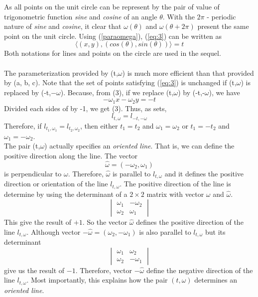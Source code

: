 \documentclass[a4paper]{article}
\begin{document}
As all points on the unit circle can be represent by the pair of value of trigonometric function \textit{sine} and \textit{cosine} of an angle $\theta$. With the $2\pi$ - periodic nature of \textit{sine} and \textit{cosine}, it clear that $\omega(\theta)$ and $\omega(\theta + 2\pi)$ present the same point on the unit circle. Using (\ref{paraomega}), (\ref{eq:3}) can be written as
\begin{equation}\label{ltw}
    \langle (x,y),(cos(\theta),sin(\theta))\rangle = t
\end{equation}
Both notations for lines and points on the circle are used in the sequel.\\ \\
The parameterization provided by (t,$\omega$) is much more efficient than that provided by (a, b, c). Note that the set of points satisfying (\ref{eq:3}) is unchanged if (t,$\omega$) is replaced by (-t,$-\omega$). Because, from (3), if we replace (t,$\omega$) by (-t,-$\omega$), we have
\begin{equation}
    -\omega_1 x - \omega_2 y = -t
\end{equation}
Divided each sides of by -1, we get (3). Thus, as sets,
\begin{equation}
    l_{t,\omega} = l_{-t,-\omega}
\end{equation}
Therefore, if $l_{t_1,\omega_1} = l_{t_2,\omega_2}$, then either $t_1 = t_2$ and $\omega_1 = \omega_2$ or $t_1 = -t_2$ and $\omega_1 = -\omega_2$.\\
The pair (t,$\omega$) actually specifies an \textit{oriented line}. That is, we can define the positive direction along the line. The vector
\begin{equation*}
    \hat{\omega } = (-\omega_2,\omega_1)
\end{equation*}
is perpendicular to $\omega$. Therefore, $\hat{\omega}$ is parallel to $l_{t,\omega}$ and it defines the positive direction or orientation of the line $l_{t,\omega}$. The positive direction of the line is determine by using the determinant of a $2 \times 2$ matrix with vector $\omega$ and $\hat{\omega}$.
\[
\begin{vmatrix}
    \omega_1 & -\omega_2\\
    \omega_2 & \omega_1 
\end{vmatrix}
\]
This give the result of $+1$. So the vector $\hat{\omega}$ defines the positive direction of the line $l_{t,\omega}$.
Although vector $-\hat{\omega} = (\omega_2,-\omega_1)$ is also parallel to $l_{t,\omega}$ but its determinant
\[
    \begin{vmatrix}
        \omega_1 & \omega_2\\
        \omega_2 & -\omega_1 
    \end{vmatrix}
\]
give us the result of $-1$. Therefore, vector $-\hat{\omega}$ define the negative direction of the line $l_{t,\omega}$. Most importantly, this explains how the pair $(t,\omega)$ determines an \textit{oriented line}. 
\end{document}
